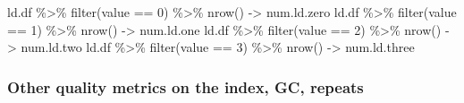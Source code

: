 \documentclass[
]{article}
\newenvironment{Shaded}{\begin{snugshade}}{\end{snugshade}}
\newcommand{\DecValTok}[1]{\textcolor[rgb]{0.00,0.00,0.81}{#1}}
\newcommand{\FunctionTok}[1]{\textcolor[rgb]{0.00,0.00,0.00}{#1}}
\newcommand{\NormalTok}[1]{#1}
\newcommand{\OtherTok}[1]{\textcolor[rgb]{0.56,0.35,0.01}{#1}}
\newcommand{\SpecialCharTok}[1]{\textcolor[rgb]{0.00,0.00,0.00}{#1}}
\begin{document}
\begin{Shaded}
\begin{Highlighting}[]
\NormalTok{ld.df }\SpecialCharTok{\%\textgreater{}\%} \FunctionTok{filter}\NormalTok{(value }\SpecialCharTok{==} \DecValTok{0}\NormalTok{) }\SpecialCharTok{\%\textgreater{}\%} \FunctionTok{nrow}\NormalTok{() }\OtherTok{{-}\textgreater{}}\NormalTok{ num.ld.zero }
\NormalTok{ld.df }\SpecialCharTok{\%\textgreater{}\%} \FunctionTok{filter}\NormalTok{(value }\SpecialCharTok{==} \DecValTok{1}\NormalTok{) }\SpecialCharTok{\%\textgreater{}\%} \FunctionTok{nrow}\NormalTok{() }\OtherTok{{-}\textgreater{}}\NormalTok{ num.ld.one }
\NormalTok{ld.df }\SpecialCharTok{\%\textgreater{}\%} \FunctionTok{filter}\NormalTok{(value }\SpecialCharTok{==} \DecValTok{2}\NormalTok{) }\SpecialCharTok{\%\textgreater{}\%} \FunctionTok{nrow}\NormalTok{() }\OtherTok{{-}\textgreater{}}\NormalTok{ num.ld.two}
\NormalTok{ld.df }\SpecialCharTok{\%\textgreater{}\%} \FunctionTok{filter}\NormalTok{(value }\SpecialCharTok{==} \DecValTok{3}\NormalTok{) }\SpecialCharTok{\%\textgreater{}\%} \FunctionTok{nrow}\NormalTok{() }\OtherTok{{-}\textgreater{}}\NormalTok{ num.ld.three}
\end{Highlighting}
\end{Shaded}

\hypertarget{other-quality-metrics-on-the-index-gc-repeats}{%
\subsubsection{Other quality metrics on the index, GC,
repeats}\label{other-quality-metrics-on-the-index-gc-repeats}}
\end{document}
